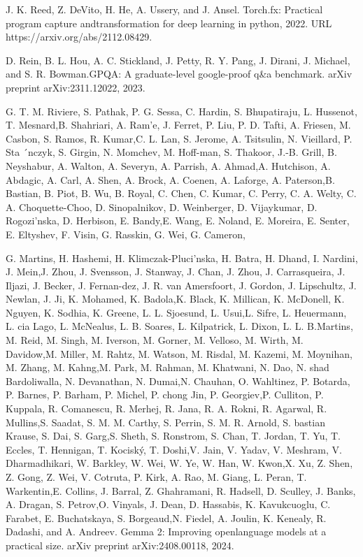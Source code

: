 \documentclass[
  10
]{article}
\begin{document}
J. K. Reed, Z. DeVito, H. He, A. Ussery, and J. Ansel. Torch.fx:
Practical program capture andtransformation for deep learning in python,
2022. URL https://arxiv.org/abs/2112.08429.

D. Rein, B. L. Hou, A. C. Stickland, J. Petty, R. Y. Pang, J. Dirani, J.
Michael, and S. R. Bowman.GPQA: A graduate-level google-proof q\&a
benchmark. arXiv preprint arXiv:2311.12022, 2023.

G. T. M. Riviere, S. Pathak, P. G. Sessa, C. Hardin, S. Bhupatiraju, L.
Hussenot, T. Mesnard,B. Shahriari, A. Ram'e, J. Ferret, P. Liu, P. D.
Tafti, A. Friesen, M. Casbon, S. Ramos, R. Kumar,C. L. Lan, S. Jerome,
A. Tsitsulin, N. Vieillard, P. Sta ´nczyk, S. Girgin, N. Momchev, M.
Hoff-man, S. Thakoor, J.-B. Grill, B. Neyshabur, A. Walton, A. Severyn,
A. Parrish, A. Ahmad,A. Hutchison, A. Abdagic, A. Carl, A. Shen, A.
Brock, A. Coenen, A. Laforge, A. Paterson,B. Bastian, B. Piot, B. Wu, B.
Royal, C. Chen, C. Kumar, C. Perry, C. A. Welty, C. A. Choquette-Choo,
D. Sinopalnikov, D. Weinberger, D. Vijaykumar, D. Rogozi'nska, D.
Herbison, E. Bandy,E. Wang, E. Noland, E. Moreira, E. Senter, E.
Eltyshev, F. Visin, G. Rasskin, G. Wei, G. Cameron,

G. Martins, H. Hashemi, H. Klimczak-Pluci'nska, H. Batra, H. Dhand, I.
Nardini, J. Mein,J. Zhou, J. Svensson, J. Stanway, J. Chan, J. Zhou, J.
Carrasqueira, J. Iljazi, J. Becker, J. Fernan-dez, J. R. van Amersfoort,
J. Gordon, J. Lipschultz, J. Newlan, J. Ji, K. Mohamed, K. Badola,K.
Black, K. Millican, K. McDonell, K. Nguyen, K. Sodhia, K. Greene, L. L.
Sjoesund, L. Usui,L. Sifre, L. Heuermann, L. cia Lago, L. McNealus, L.
B. Soares, L. Kilpatrick, L. Dixon, L. L. B.Martins, M. Reid, M. Singh,
M. Iverson, M. Gorner, M. Velloso, M. Wirth, M. Davidow,M. Miller, M.
Rahtz, M. Watson, M. Risdal, M. Kazemi, M. Moynihan, M. Zhang, M.
Kahng,M. Park, M. Rahman, M. Khatwani, N. Dao, N. shad Bardoliwalla, N.
Devanathan, N. Dumai,N. Chauhan, O. Wahltinez, P. Botarda, P. Barnes, P.
Barham, P. Michel, P. chong Jin, P. Georgiev,P. Culliton, P. Kuppala, R.
Comanescu, R. Merhej, R. Jana, R. A. Rokni, R. Agarwal, R. Mullins,S.
Saadat, S. M. M. Carthy, S. Perrin, S. M. R. Arnold, S. bastian Krause,
S. Dai, S. Garg,S. Sheth, S. Ronstrom, S. Chan, T. Jordan, T. Yu, T.
Eccles, T. Hennigan, T. Kociský, T. Doshi,V. Jain, V. Yadav, V. Meshram,
V. Dharmadhikari, W. Barkley, W. Wei, W. Ye, W. Han, W. Kwon,X. Xu, Z.
Shen, Z. Gong, Z. Wei, V. Cotruta, P. Kirk, A. Rao, M. Giang, L. Peran,
T. Warkentin,E. Collins, J. Barral, Z. Ghahramani, R. Hadsell, D.
Sculley, J. Banks, A. Dragan, S. Petrov,O. Vinyals, J. Dean, D.
Hassabis, K. Kavukcuoglu, C. Farabet, E. Buchatskaya, S. Borgeaud,N.
Fiedel, A. Joulin, K. Kenealy, R. Dadashi, and A. Andreev. Gemma 2:
Improving openlanguage models at a practical size. arXiv preprint
arXiv:2408.00118, 2024.
\end{document}
